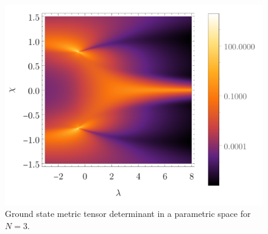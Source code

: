 \begin{figure}[H]
    \centering
    \includegraphics[scale=1.3]{../img/N=3_gDivergence.pdf}
    \caption{Ground state metric tensor determinant in a parametric space for $N=3$.}
    \label{fig:N=3_gDivenrgence}    
\end{figure}

